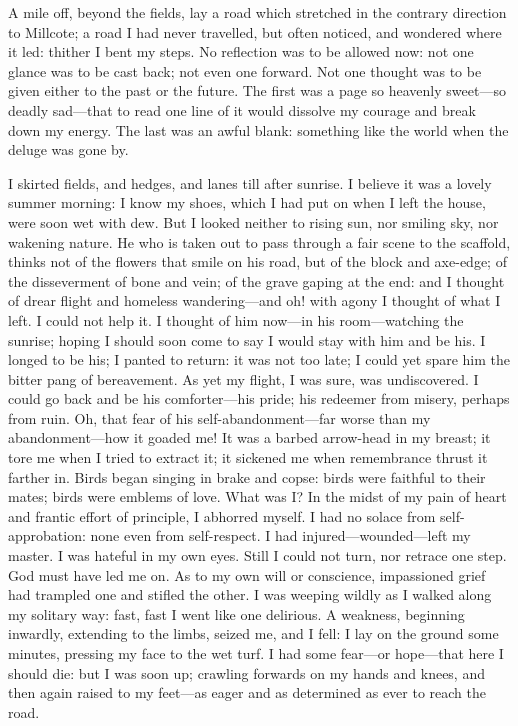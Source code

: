 A mile off, beyond the fields, lay a road which stretched in the
contrary direction to Millcote; a road I had never travelled, but often
noticed, and wondered where it led: thither I bent my steps. No
reflection was to be allowed now: not one glance was to be cast back;
not even one forward. Not one thought was to be given either to the
past or the future. The first was a page so heavenly sweet---so deadly
sad---that to read one line of it would dissolve my courage and break
down my energy. The last was an awful blank: something like the world
when the deluge was gone by.

I skirted fields, and hedges, and lanes till after sunrise. I believe
it was a lovely summer morning: I know my shoes, which I had put on when
I left the house, were soon wet with dew. But I looked neither to
rising sun, nor smiling sky, nor wakening nature. He who is taken out
to pass through a fair scene to the scaffold, thinks not of the flowers
that smile on his road, but of the block and axe-edge; of the
disseverment of bone and vein; of the grave gaping at the end: and I
thought of drear flight and homeless wandering---and oh! with agony I
thought of what I left. I could not help it. I thought of him now---in
his room---watching the sunrise; hoping I should soon come to say I
would stay with him and be his. I longed to be his; I panted to return:
it was not too late; I could yet spare him the bitter pang of
bereavement. As yet my flight, I was sure, was undiscovered. I could
go back and be his comforter---his pride; his redeemer from misery,
perhaps from ruin. Oh, that fear of his self-abandonment---far worse
than my abandonment---how it goaded me! It was a barbed arrow-head in
my breast; it tore me when I tried to extract it; it sickened me when
remembrance thrust it farther in. Birds began singing in brake and
copse: birds were faithful to their mates; birds were emblems of love.
What was I? In the midst of my pain of heart and frantic effort of
principle, I abhorred myself. I had no solace from self-approbation:
none even from self-respect. I had injured---wounded---left my master.
I was hateful in my own eyes. Still I could not turn, nor retrace one
step. God must have led me on. As to my own will or conscience,
impassioned grief had trampled one and stifled the other. I was weeping
wildly as I walked along my solitary way: fast, fast I went like one
delirious. A weakness, beginning inwardly, extending to the limbs,
seized me, and I fell: I lay on the ground some minutes, pressing my
face to the wet turf. I had some fear---or hope---that here I should
die: but I was soon up; crawling forwards on my hands and knees, and
then again raised to my feet---as eager and as determined as ever to
reach the road.

